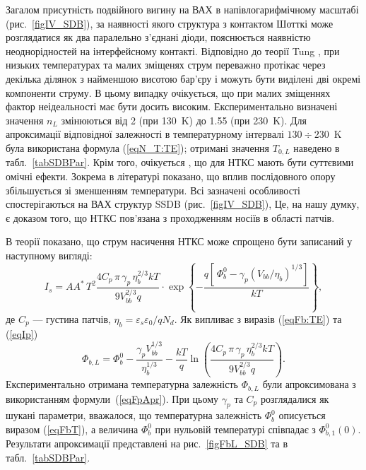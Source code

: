 Загалом присутність подвійного вигину на ВАХ в напівлогарифмічному масштабі (рис.~\ref{figIV_SDB}),
за наявності якого структура з контактом Шотткі може розглядатися як два паралельно з'єднані діоди, пояснюється наявністю неоднорідностей на інтерфейсному контакті.
Відповідно до теорії Tung \cite{Tung:PhysRev,Tung:MSE},
при низьких температурах та малих зміщенях струм переважно протікає через декілька ділянок з найменшою висотою бар'єру і можуть бути виділені дві окремі компоненти струму.
В цьому випадку очікується, що при малих зміщеннях фактор неідеальності має бути досить високим.
Експериментально визначені значення $n_L$ змінюються від 2 (при 130~K) до 1.55 (при 230~K).
Для апроксимації відповідної залежності в температурному інтервалі $130\div230$~K була використана формула (\ref{eqN_T:TE});
отримані значення $T_{0,L}$ наведено в табл.~\ref{tabSDBPar}.
Крім того, очікується \cite{Tung:PhysRev,Tung:MSE}, що для НТКС мають бути суттєвими омічні ефекти.
Зокрема в літературі  \cite{Gammon2013} показано, що вплив послідовного опору збільшується зі зменшенням температури.
Всі зазначені особливості спостерігаються на ВАХ структур SSDB (рис.~\ref{figIV_SDB}),
Це, на нашу думку, є доказом того, що НТКС пов'язана з проходженням носіїв в області патчів.


В теорії \cite{Tung:PhysRev} показано, що струм насичення НТКС може спрощено бути записаний у наступному вигляді:
\begin{equation}
\label{eqIp}
I_s=AA^*\,T^2\frac{4C_p\,\pi\,\gamma_p\,\eta_b^{2/3}kT}{9V_{bb}^{2/3}q}\cdot
\exp\left\{-\frac{q\left[\,\Phi_{b}^0-\gamma_p (V_{bb}/\eta_b)^{1/3}\right]}{kT}\right\},
\end{equation}
де
$C_p$ --- густина патчів,
$\eta_{b}=\varepsilon_s\varepsilon_0/qN_d$.
Як випливає з виразів (\ref{eqFb:TE}) та (\ref{eqIp})
\begin{equation}
\label{eqFpApr}
\Phi_{b,L}=\Phi_{b}^0-\frac{\gamma_p V_{bb}^{1/3}}{\eta_b^{1/3}} -\frac{kT}{q}\ln\left(\frac{4C_p\,\pi\,\gamma_p\,\eta_b^{2/3}kT}{9V_{bb}^{2/3}q}\right).
\end{equation}
Експериментально отримана температурна залежність $\Phi_{b,L}$ були апроксимована з використанням формули~(\ref{eqFpApr}).
При цьому $\gamma_p$ та $C_p$ розглядалися як шукані параметри,
вважалося, що температурна залежність $\Phi_{b}^0$ описується виразом (\ref{eqFbT}), а величина $\Phi_{b}^0$ при нульовій температурі
співпадає з $\Phi_{b,1}^0(0)$.
Результати апроксимації представлені на рис.~\ref{figFbL_SDB} та в табл.~\ref{tabSDBPar}.

